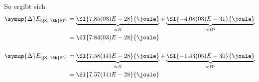 So ergibt sich
\begin{align*}
    \symup{\Delta}E_\text{QZ, \Rb{87}} &=
        \underbrace{\SI{7.85(03)E-28}{\joule}}_{\propto B} +
        \underbrace{\SI{-4.08(03)E-31}{\joule}}_{\propto B^2} \\
        &= \SI{7.84(03)E-28}{\joule}
    \\
    \\
    \symup{\Delta}E_\text{QZ, \Rb{85}} &=
        \underbrace{\SI{7.58(14)E-28}{\joule}}_{\propto B} +
        \underbrace{\SI{-1.43(05)E-30}{\joule}}_{\propto B^2} \\
        &= \SI{7.57(14)E-28}{\joule}
\end{align*}
